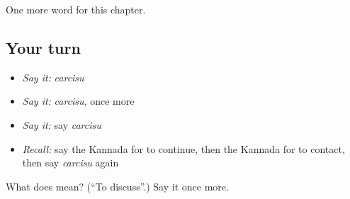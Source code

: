\begin{grammarlens}[title={What you've built}]
One more word for this chapter.
\end{grammarlens}

\subsection*{Your turn}
\begin{itemize}
\raggedright
  \item \emph{Say it:} \emph{carcisu}
  \item \emph{Say it:} \emph{carcisu}, once more
  \item \emph{Say it:} say \emph{carcisu}
  \item \emph{Recall:} say the Kannada for to continue, then the Kannada for to contact, then say \emph{carcisu} again
\end{itemize}

\begin{tcolorbox}[breakable,colback=teal!4,colframe=teal!35!black,title={Before you move on}]
What does  mean? (\textquotedblleft{}To discuss\textquotedblright{}.) Say it once more.
\end{tcolorbox}
